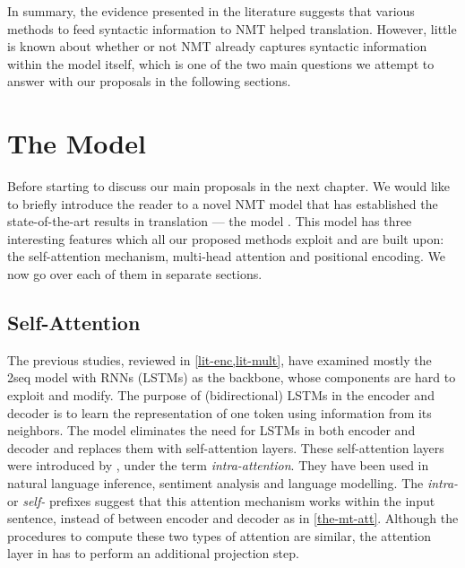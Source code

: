 In summary, the evidence presented in the literature suggests that various methods to feed syntactic information to NMT helped translation.
However, little is known about whether or not NMT already captures syntactic information within the model itself, which is one of the two main questions we attempt to answer with our proposals in the following sections.

\section{The \transformer Model}
\label{lit-trans}

Before starting to discuss our main proposals in the next chapter. We would like to briefly introduce the reader to a novel NMT model that has established the state-of-the-art results in translation --- the \transformer model \citep{DBLP:conf/nips/VaswaniSPUJGKP17}.
This model has three interesting features which all our proposed methods exploit and are built upon: the self-attention mechanism, multi-head attention and positional encoding.
We now go over each of them in separate sections.

\subsection{Self-Attention}
\label{lit-trans-att}

The previous studies, reviewed in \cref{lit-enc,lit-mult}, have examined mostly the \seq2seq model with RNNs (LSTMs) as the backbone, whose components are hard to exploit and modify.
The purpose of (bidirectional) LSTMs in the encoder and decoder is to learn the representation of one token using information from its neighbors.
The \transformer model eliminates the need for LSTMs in both encoder and decoder and replaces them with self-attention layers.
These self-attention layers were introduced by \cite{cheng-dong-lapata:2016:EMNLP2016}, under the term \textit{intra-attention}.
They have been used in natural language inference, sentiment analysis and language modelling.
The \textit{intra-} or \textit{self-} prefixes suggest that this attention mechanism works within the input sentence, instead of between encoder and decoder as in \cref{the-mt-att}. Although the procedures to compute these two types of attention are similar, the attention layer in \transformer has to perform an additional projection step. 

